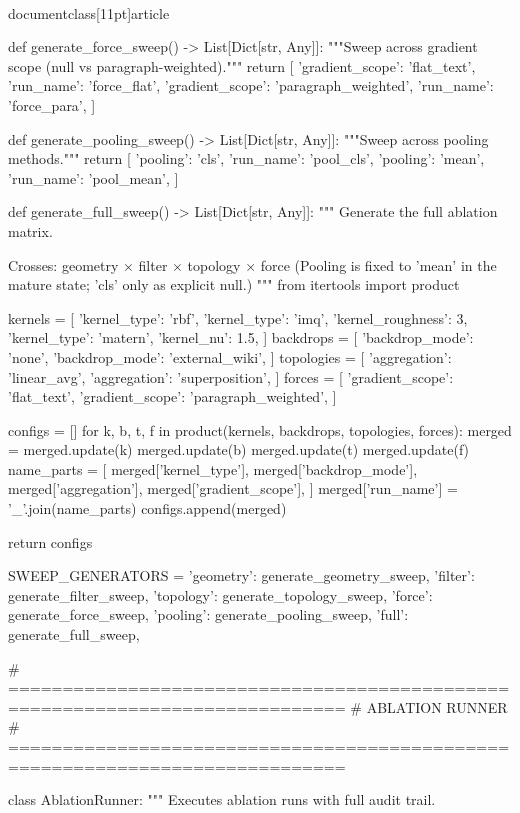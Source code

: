\\documentclass[11pt]{article}
\begin{document}
\begin{CodeBlock}
def generate_force_sweep() -> List[Dict[str, Any]]:
    """Sweep across gradient scope (null vs paragraph-weighted)."""
    return [
        {'gradient_scope': 'flat_text', 'run_name': 'force_flat'},
        {'gradient_scope': 'paragraph_weighted', 'run_name': 'force_para'},
    ]


def generate_pooling_sweep() -> List[Dict[str, Any]]:
    """Sweep across pooling methods."""
    return [
        {'pooling': 'cls', 'run_name': 'pool_cls'},
        {'pooling': 'mean', 'run_name': 'pool_mean'},
    ]


def generate_full_sweep() -> List[Dict[str, Any]]:
    """
    Generate the full ablation matrix.

    Crosses: geometry × filter × topology × force
    (Pooling is fixed to 'mean' in the mature state; 'cls' only as explicit null.)
    """
    from itertools import product

    kernels = [
        {'kernel_type': 'rbf'},
        {'kernel_type': 'imq', 'kernel_roughness': 3},
        {'kernel_type': 'matern', 'kernel_nu': 1.5},
    ]
    backdrops = [
        {'backdrop_mode': 'none'},
        {'backdrop_mode': 'external_wiki'},
    ]
    topologies = [
        {'aggregation': 'linear_avg'},
        {'aggregation': 'superposition'},
    ]
    forces = [
        {'gradient_scope': 'flat_text'},
        {'gradient_scope': 'paragraph_weighted'},
    ]

    configs = []
    for k, b, t, f in product(kernels, backdrops, topologies, forces):
        merged = {}
        merged.update(k)
        merged.update(b)
        merged.update(t)
        merged.update(f)
        name_parts = [
            merged['kernel_type'],
            merged['backdrop_mode'],
            merged['aggregation'],
            merged['gradient_scope'],
        ]
        merged['run_name'] = '_'.join(name_parts)
        configs.append(merged)

    return configs


SWEEP_GENERATORS = {
    'geometry': generate_geometry_sweep,
    'filter': generate_filter_sweep,
    'topology': generate_topology_sweep,
    'force': generate_force_sweep,
    'pooling': generate_pooling_sweep,
    'full': generate_full_sweep,
}


# =============================================================================
# ABLATION RUNNER
# =============================================================================

class AblationRunner:
    """
    Executes ablation runs with full audit trail.


\end{CodeBlock}
\end{document}
